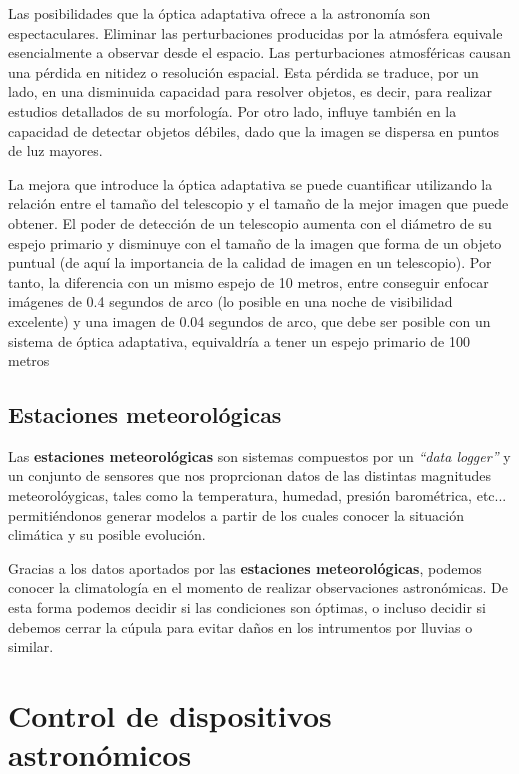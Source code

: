 \bigskip
Las posibilidades que la óptica adaptativa ofrece a la astronomía son espectaculares. Eliminar las perturbaciones producidas por la atmósfera equivale esencialmente a observar desde el espacio. Las perturbaciones atmosféricas causan una pérdida en nitidez o resolución espacial. Esta pérdida se traduce, por un lado, en una disminuida capacidad para resolver objetos, es decir, para realizar estudios detallados de su morfología. Por otro lado, influye también en la capacidad de detectar objetos débiles, dado que la imagen se dispersa en puntos de luz mayores.

\bigskip
La mejora que introduce la óptica adaptativa se puede cuantificar utilizando la relación entre el tamaño del telescopio y el tamaño de la mejor imagen que puede obtener. El poder de detección de un telescopio aumenta con el diámetro de su espejo primario y disminuye con el tamaño de la imagen que forma de un objeto puntual (de aquí la importancia de la calidad de imagen en un telescopio). Por tanto, la diferencia con un mismo espejo de 10 metros, entre conseguir enfocar imágenes de 0.4 segundos de arco (lo posible en una noche de visibilidad excelente) y una imagen de 0.04 segundos de arco, que debe ser posible con un sistema de óptica adaptativa, equivaldría a tener un espejo primario de 100 metros

\subsection{Estaciones meteorológicas}

Las \textbf{estaciones meteorológicas} son sistemas compuestos por un \textit{``data logger''} y un conjunto de sensores que nos proprcionan datos de las distintas magnitudes meteorolóygicas, tales como la temperatura, humedad, presión barométrica, etc... permitiéndonos generar modelos a partir de los cuales conocer la situación climática y su posible evolución. 

\bigskip
Gracias a los datos aportados por las \textbf{estaciones meteorológicas}, podemos conocer la climatología en el momento de realizar observaciones astronómicas. De esta forma podemos decidir si las condiciones son óptimas, o incluso decidir si debemos cerrar la cúpula para evitar daños en los intrumentos por lluvias o similar. 

\newpage
\section{Control de dispositivos astronómicos}


